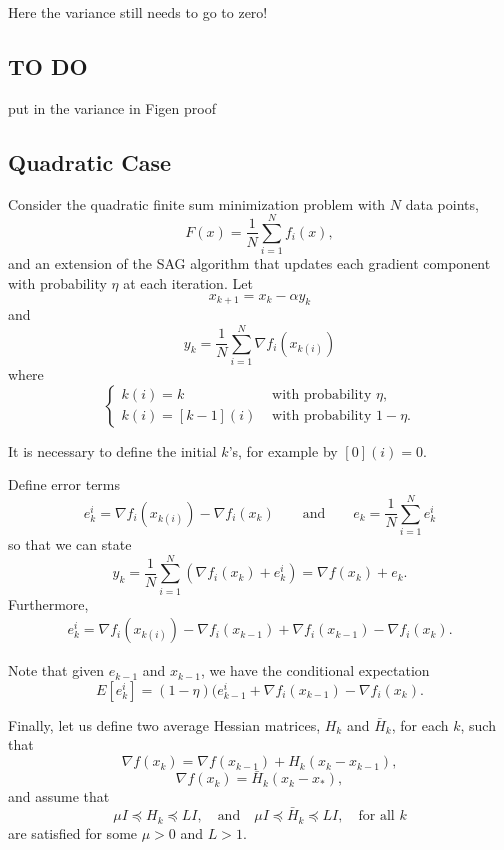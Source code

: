 \documentclass[11pt]{article}
\begin{document}
Here the variance still needs to go to zero!	
	
\subsection{TO DO}

put in the variance in Figen proof

\subsection{Quadratic Case}

 
\noindent 
Consider the quadratic finite sum minimization problem with $N$ data points, 
\[
 F(x) = \frac{1}{N}\sum_{i=1}^N f_i(x),
\]
and an extension of the SAG algorithm that updates each gradient component with probability $\eta$ at each iteration.  Let 
\[
 x_{k+1} = x_k -\alpha y_k
\]
and
\[
 y_k = \frac{1}{N}\sum_{i=1}^N \nabla f_i(x_{k(i)}) 
\]
where
\[
 \begin{cases}
  k(i) = k  & \mbox{ with probability }\eta,\\
  k(i) = [k-1](i) & \mbox{ with probability }1-\eta.
 \end{cases}
\]

It is necessary to define the initial $k$'s, for example by $[0](i)=0$.

\bigskip

\noindent
Define error terms 
\[
 e_k^i = \nabla f_i(x_{k(i)})-\nabla f_i(x_k) \qquad \mbox{and} \qquad e_k=\frac{1}{N}\sum_{i=1}^N e_k^i
\]
so that we can state 
\[
 y_k = \frac{1}{N}\sum_{i=1}^N (\nabla f_i(x_k)+e_k^i) = \nabla f(x_k) + e_k.
\]
Furthermore, 
\begin{align*}
 e_k^i = \nabla f_i(x_{k(i)})-\nabla f_i(x_{k-1})+\nabla f_i(x_{k-1})-\nabla f_i(x_k).
\end{align*}
	
Note that given $e_{k-1}$ and $x_{k-1}$, we have the conditional expectation 
\[
 E[e_k^i] = (1-\eta)(e_{k-1}^i + \nabla f_i(x_{k-1}) -\nabla f_i(x_k).
\]

\bigskip
\noindent
Finally, let us define two average Hessian matrices, $H_k$ and $\bar H_k$, for each $k$, such that
\[
 \nabla f(x_k) = \nabla f(x_{k-1})+H_k(x_k-x_{k-1}),
\]
\[
 \nabla f(x_k) = \bar H_k(x_k-x_\ast),
\]
and assume that 
\[
  \mu I \preceq H_k \preceq L I , \quad \mbox{and} \quad \mu I \preceq \bar H_k \preceq L I,\quad \mbox{for all }k
\]
are satisfied for some $\mu>0$ and $L>1$.

\bigskip
\end{document}
